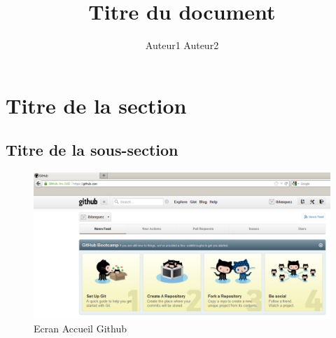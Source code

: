 \documentclass{article}
\title{Titre du document}
\author{Auteur1 Auteur2}
\begin{document}
  
\maketitle
\tableofcontents
  
\section{Titre de la section}
  
\subsection{Titre de la sous-section}
  
\begin{figure}
  \centering
  \includegraphics[width=0.7\linewidth]{AccueilGithubPourTutoGit}
  \caption{Ecran Accueil Github}
\end{figure}
  
\end{document}
